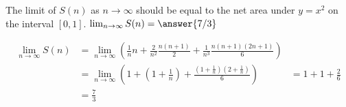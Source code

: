 \documentclass{ximera}
\begin{document}
\begin{question}
		\begin{question}
		The limit of $S(n)$ as $n \to \infty$ should be equal to the net area under $y=x^2$ on the interval $[0,1]$.  $\lim_{n \to \infty} S(n) = \answer{7/3}$
			\begin{hint}
				\begin{align*}
					\lim_{n \to \infty} S(n) &= \lim_{n \to \infty} \left( \frac{1}{n} n + \frac{2}{n^2} \frac{n(n+1)}{2} + \frac{1}{n^3} \frac{n(n+1)(2n+1)}{6} \right)\\
					&= \lim_{n \to \infty} \left( 1 + (1+\frac{1}{n})+ \frac{(1+\frac{1}{n})(2+\frac{1}{n})}{6}\right)
					&=1+1+\frac{2}{6}\\
					&=\frac{7}{3}					 
				\end{align*}
			\end{hint}
		\end{question}
	\end{question}
	
	
\end{document}
